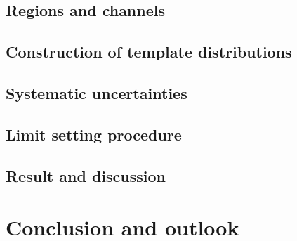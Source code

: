 \section{Regions and channels}
\section{Construction of template distributions}
\section{Systematic uncertainties}

\section{Limit setting procedure}
\section{Result and discussion}
\chapter{Conclusion and outlook}
\label{s:showcase}
%



\backmatter

\hypersetup{urlcolor=darkgreen}
\printbibliography  %
\hypersetup{urlcolor=darkblue}


